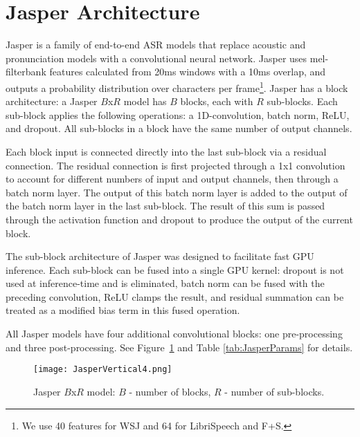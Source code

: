 \documentclass[a4paper]{article}
\begin{document}
\section{Jasper Architecture}

Jasper is a family of end-to-end ASR models that replace acoustic and pronunciation models with a convolutional neural network. Jasper uses mel-filterbank features calculated from 20ms windows with a 10ms overlap, and outputs a probability distribution over characters per frame\footnote{We use 40 features for WSJ and 64 for LibriSpeech and F+S.}. Jasper has a block architecture: a Jasper $B$x$R$ model has $B$ blocks, each with $R$ sub-blocks. Each sub-block applies the following operations: a 1D-convolution, batch norm, ReLU, and dropout. All sub-blocks in a block have the same number of output channels.

Each block input is connected directly into the last sub-block via a residual connection.  The residual connection is first projected through a 1x1 convolution to account for different numbers of input and output channels, then through a batch norm layer. The output of this batch norm layer is added to the output of the batch norm layer in the last sub-block. The result of this sum is passed through the activation function and dropout to produce the output of the current block. 

The sub-block architecture of Jasper was designed to facilitate fast GPU inference. Each sub-block can be fused into a single GPU kernel: dropout is not used at inference-time and is eliminated, batch norm can be fused with the preceding convolution, ReLU clamps the result, and residual summation can be treated as a modified bias term in this fused operation.

All Jasper models have four additional convolutional blocks: one pre-processing and three post-processing. See Figure~\ref{fig:jasper_arch} and Table \ref{tab:JasperParams} for details.

\begin{figure}[t]
  \centering
  \texttt{[image: JasperVertical4.png]}
  \caption{Jasper $B$x$R$ model: $B$ - number of blocks, $R$ - number of sub-blocks.}
  \label{fig:jasper_arch}
\end{figure}
\end{document}
